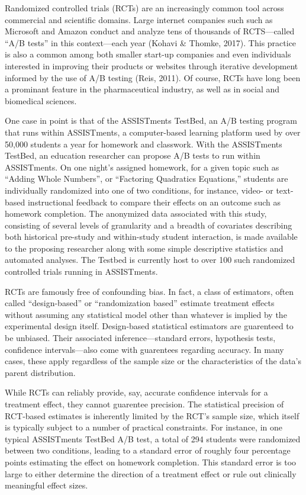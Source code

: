 Randomized controlled trials (RCTs) are an increasingly common tool
across commercial and scientific domains.
Large internet companies such such as Microsoft and Amazon conduct and
analyze tens of thousands of RCTS---called
``A/B tests'' in this context---each year (Kohavi \& Thomke,
2017). This practice is also a
common among both  smaller start-up companies and even individuals
interested in improving their products or websites through iterative
development informed by the use of A/B testing (Reis, 2011).
Of course, RCTs have long been a prominant feature in the
pharmaceutical industry, as well as in social and biomedical
sciences.

One case in point is that of  the ASSISTments TestBed, an A/B testing
program that runs within ASSISTments, a computer-based learning
platform used by over 50,000 students a year for homework and
classwork.
With the ASSISTments TestBed, an education
researcher can propose A/B tests to run within ASSISTments.
On one night's assigned homework, for a given topic such as ``Adding
Whole Numbers'', or
``Factoring Quadratics Equations,'' students are individually randomized
into one of two conditions, for instance, video- or text-based
instructional feedback to compare their effects on an outcome such as
homework completion. The anonymized data associated with this study,
consisting of several levels of granularity and a breadth of
covariates describing both historical pre-study and within-study
student interaction, is made available to the proposing researcher
along with some simple descriptive statistics and automated
analyses. The Testbed is currently host to over 100 such randomized
controlled trials running in ASSISTments.

RCTs are famously free of confounding bias.
In fact, a class of estimators, often called ``design-based''
\citet[e.g.][]{schochet2015statistical} or ``randomization based''
\citet[e.g.][]{rosenbaum:2002a} estimate treatment effects without assuming
any statistical model other than whatever is implied by the
experimental design itself.
Design-based statistical estimators are guarenteed to be unbiased.
Their associated inference---standard errors, hypothesis tests,
confidence intervals---also come with guarentees regarding accuracy.
In many cases, these apply regardless of the sample size or
the characteristics of the data's parent distribution.

While RCTs can reliably provide, say, accurate confidence intervals
for a treatment effect, they cannot guarentee precision.
The statistical precision of RCT-based estimates is inherently limited
by the RCT's sample size, which itself is typically subject to a
number of practical constraints.
For instance, in one typical ASSISTments TestBed A/B test, a total of
294 students were randomized between two conditions, leading to a
standard error of roughly four percentage points estimating the effect
on homework completion.
This standard error is too large to either determine the direction of
a treatment effect or rule out clinically meaningful effect sizes.

